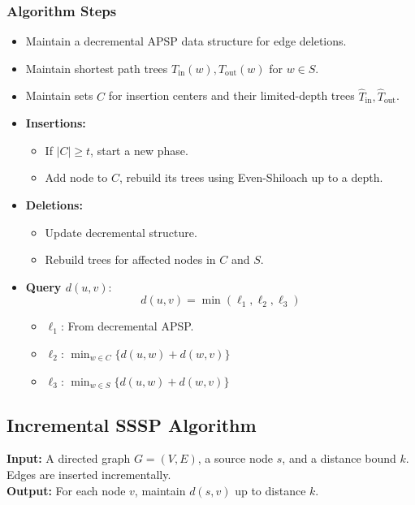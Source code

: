\documentclass{report}
\begin{document}
\subsubsection*{Algorithm Steps}
\begin{itemize}
    \item Maintain a decremental APSP data structure for edge deletions.
    \item Maintain shortest path trees \( T_{\text{in}}(w), T_{\text{out}}(w) \) for \( w \in S \).
    \item Maintain sets \( C \) for insertion centers and their limited-depth trees \( \hat{T}_{\text{in}}, \hat{T}_{\text{out}} \).
    \item \textbf{Insertions:}
    \begin{itemize}
        \item If \( |C| \geq t \), start a new phase.
        \item Add node to \( C \), rebuild its trees using Even-Shiloach up to a depth.
    \end{itemize}
    \item \textbf{Deletions:}
    \begin{itemize}
        \item Update decremental structure.
        \item Rebuild trees for affected nodes in \( C \) and \( S \).
    \end{itemize}
    \item \textbf{Query \( d(u, v) \)}:
    \[
    d(u, v) = \min(\ell_1, \ell_2, \ell_3)
    \]
    \begin{itemize}
        \item \(\ell_1\): From decremental APSP.
        \item \(\ell_2\): \( \min_{w \in C} \{ d(u, w) + d(w, v) \} \)
        \item \(\ell_3\): \( \min_{w \in S} \{ d(u, w) + d(w, v) \} \)
    \end{itemize}
\end{itemize}

\subsection*{Incremental SSSP Algorithm}

\textbf{Input:} A directed graph \( G = (V, E) \), a source node \( s \), and a distance bound \( k \). Edges are inserted incrementally.\\
\textbf{Output:} For each node \( v \), maintain \( d(s, v) \) up to distance \( k \).
\end{document}
